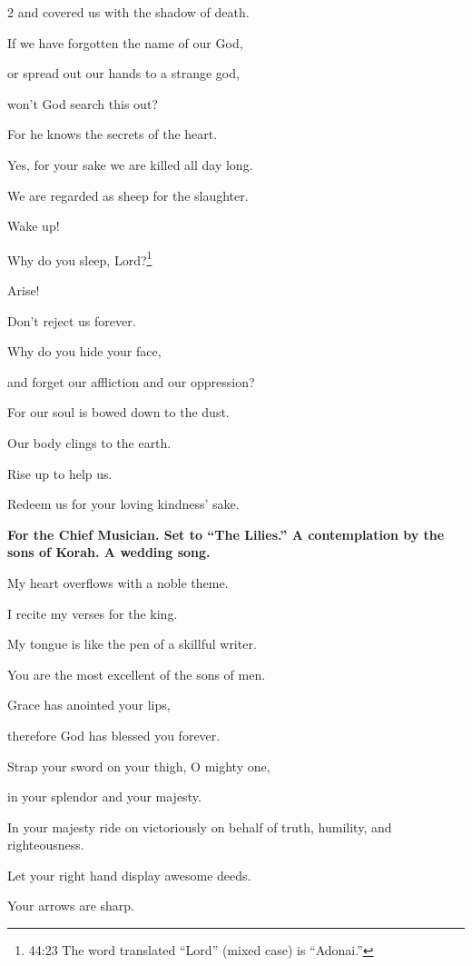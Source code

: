 \begin{multicols}{2}
	and covered us with the shadow of death.
	
	
	\myverse{}If we have forgotten the name of our God,
	
	or spread out our hands to a strange god,
	
	
	\myverse{}won’t God search this out?
	
	For he knows the secrets of the heart.
	
	
	\myverse{}Yes, for your sake we are killed all day long.
	
	We are regarded as sheep for the slaughter.
	
	
	\myverse{}Wake up!
	
	Why do you sleep, Lord?\footnote{44:23 The word translated “Lord” (mixed case) is “Adonai.”
	}
	
	Arise!
	
	Don’t reject us forever.
	
	
	\myverse{}Why do you hide your face,
	
	and forget our affliction and our oppression?
	
	
	\myverse{}For our soul is bowed down to the dust.
	
	Our body clings to the earth.
	
	
	\myverse{}Rise up to help us.
	
	Redeem us for your loving kindness’ sake.
	
	
	\mychapter{}\textbf{For the Chief Musician. Set to “The Lilies.” A contemplation by the sons of Korah. A wedding
		song.}
	
	\myverse*{}My heart overflows with a noble theme.
	
	I recite my verses for the king.
	
	My tongue is like the pen of a skillful writer.
	
	
	\myverse{}You are the most excellent of the sons of men.
	
	Grace has anointed your lips,
	
	therefore God has blessed you forever.
	
	
	\myverse{}Strap your sword on your thigh, O mighty one,
	
	in your splendor and your majesty.
	
	
	\myverse{}In your majesty ride on victoriously on behalf of truth, humility,
	and righteousness.
	
	Let your right hand display awesome deeds.
	
	
	\myverse{}Your arrows are sharp.
	

\end{multicols}
